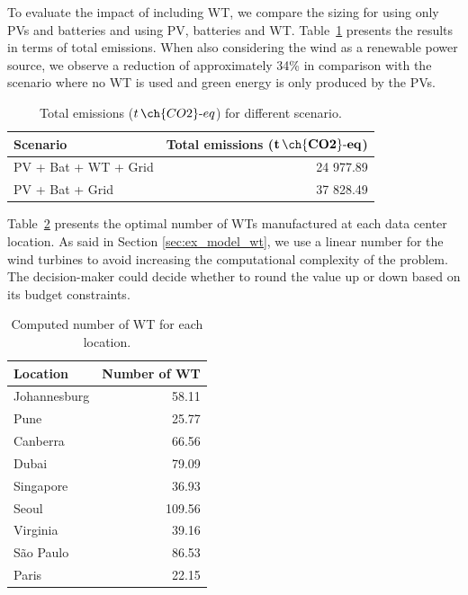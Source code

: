 To evaluate the impact of including WT, we compare the sizing for using only PVs and batteries and using PV, batteries and WT. Table~\ref{tab:total_wind_and_pv_co2} presents the results in terms of total emissions. When also considering the wind as a renewable power source, we observe a reduction of approximately 34\% in comparison with the scenario where no WT is used and green energy is only produced by the PVs.

\begin{table}[h]  
  \caption{Total emissions ($t\,\ch{CO2}\text{-}eq$) for different scenario. }\label{tab:total_wind_and_pv_co2} \centering  
  \begin{tabular}{|l|r|}
  \hline    
  \textbf{Scenario} &   \textbf{Total emissions ($\mathbf{t\,\ch{CO2}\text{-}eq}$)} \\
  \hline    
  PV + Bat + WT + Grid  & 24 977.89 \\    
  \hline
  PV + Bat + Grid       & 37 828.49 \\    
  \hline
\end{tabular}  
\end{table}


Table~\ref{tab:results_wt} presents the optimal number of WTs manufactured at each data center location. As said in Section \ref{sec:ex_model_wt}, we use a linear number for the wind turbines to avoid increasing the computational complexity of the problem. The decision-maker could decide whether to round the value up or down based on its budget constraints.

\begin{table}[h]
  \caption{Computed number of WT for each location.}\label{tab:results_wt} \centering
  \begin{tabular}{|l|r|}
  \hline    
  \textbf{Location} &   \textbf{Number of WT} \\
  \hline
  Johannesburg & 58.11   \\
  \hline
  Pune  & 25.77 \\
  \hline
  Canberra  & 66.56 \\
  \hline
  Dubai   &  79.09  \\
  \hline
  Singapore & 36.93  \\
  \hline     
  Seoul    & 109.56  \\
  \hline
  Virginia   & 39.16 \\
  \hline
  São Paulo   & 86.53 \\
  \hline 
  Paris    &   22.15 \\
  \hline
\end{tabular}  
\end{table}

